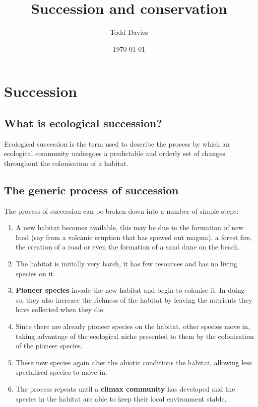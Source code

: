 \documentclass{article}
\title{Succession and conservation}
\author{Todd Davies}
\date{\today}
\begin{document}
\lhead{\today}

\maketitle

\section*{Succession}

\subsection*{What is ecological succession?}
\thispagestyle{empty}
Ecological succession is the term used to describe the process by which an ecological community undergoes a predictable and orderly set of changes throughout the colonisation of a habitat.

\subsection*{The generic process of succession}
The process of succession can be broken down into a number of simple steps:
\begin{enumerate}
	\item A new habitat becomes available, this may be due to the formation of new land (say from a volcanic eruption that has spewed out magma), a forest fire, the creation of a road or even the formation of a sand dune on the beach.
	\item The habitat is initially very harsh, it has few resources and has no living species on it.
	\item \textbf{Pioneer species} invade the new habitat and begin to colonise it. In doing so, they also increase the richness of the habitat by leaving the nutrients they have collected when they die.
	\item Since there are already pioneer species on the habitat, other species move in, taking advantage of the ecological niche presented to them by the colonisation of the pioneer species.
	\item These new species again alter the abiotic conditions the habitat, allowing less specialised species to move in.
	\item The process repeats until a \textbf{climax community} has developed and the species in the habitat are able to keep their local environment stable.
\end{enumerate}
\end{document}
